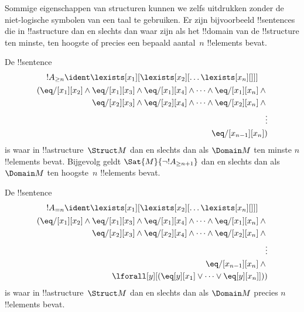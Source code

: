 \documentclass[../../../include/open-logic-section]{subfiles}
\begin{document}


\begin{explain}
Sommige eigenschappen van structuren kunnen we zelfs uitdrukken zonder
de niet-logische symbolen van een taal te gebruiken. Er zijn
bijvoorbeeld !!{sentence}s die in !!a{structure} dan en slechts dan
waar zijn als het !!{domain} van de !!{structure} ten minste, ten
hoogste of precies een bepaald aantal~$n$ !!{element}s bevat.
\end{explain}

\begin{prop}
De !!{sentence}
\begin{multline*}
  !A_{\ge n} \ident \lexists[x_1][\lexists[x_2][\dots\lexists[x_n][{}]]]\\
  \begin{aligned}
  (\eq/[x_1][x_2] \land {}
  \eq/[x_1][x_3] \land \eq/[x_1][x_4] \land \dots \land \eq/[x_1][x_n] \land {}\\
\eq/[x_2][x_3] \land \eq/[x_2][x_4] \land \dots \land {} \eq/[x_2][x_n] \land {} \\
\vdots\\
\eq/[x_{n-1}][x_n])
\end{aligned}
\end{multline*}
is waar in !!a{structure}~$\Struct M$ dan en slechts dan als
$\Domain M$ ten minste $n$ !!{element}s bevat. Bijgevolg geldt
$\Sat{M}{\lnot !A_{\ge n+1}}$ dan en slechts dan als $\Domain M$ ten
hoogste~$n$ !!{element}s bevat.

\end{prop}

\begin{prop}
De !!{sentence}
\begin{multline*}
!A_{= n} \ident \lexists[x_1][\lexists[x_2][\dots\lexists[x_n][{}]]] \\
\begin{aligned}
  (\eq/[x_1][x_2] \land {}
  \eq/[x_1][x_3] \land \eq/[x_1][x_4] \land \dots \land \eq/[x_1][x_n] \land {}\\
\eq/[x_2][x_3] \land \eq/[x_2][x_4] \land \dots \land {} \eq/[x_2][x_n] \land {} \\
\vdots\\
\eq/[x_{n-1}][x_n] \land {} \\
\lforall[y][(\eq[y][x_1] \lor \dots \lor \eq[y][x_n]]))
\end{aligned}
\end{multline*}
is waar in !!a{structure}~$\Struct M$ dan en slechts dan als
$\Domain M$ precies $n$ !!{element}s bevat.
\end{prop}
\end{document}
